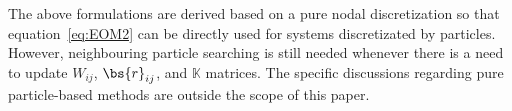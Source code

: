 The above formulations are derived based on a pure nodal discretization so that equation~\eqref{eq:EOM2} can be directly used for systems discretizated by particles. 
However, neighbouring particle searching is still needed whenever there is a need to update $W_{ij}$, $\bs{r}_{ij}$, and $\mathbb{K}$ matrices. 
The specific discussions regarding pure particle-based methods are outside the scope of this paper. 
